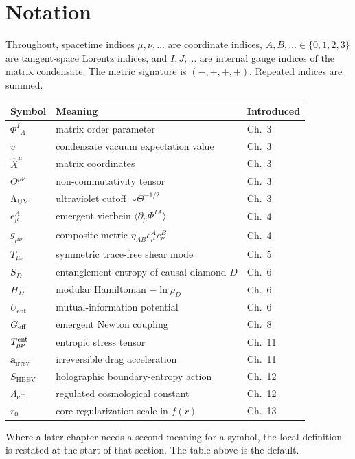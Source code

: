 \chapter{Notation}

Throughout, spacetime indices \(\mu,\nu,\ldots\) are coordinate indices,
\(A,B,\ldots\in\{0,1,2,3\}\) are tangent-space Lorentz indices, and
\(I,J,\ldots\) are internal gauge indices of the matrix condensate.
The metric signature is \((-,+,+,+)\). Repeated indices are summed.

\begin{center}
\begin{tabular}{@{}lll@{}}
\toprule
Symbol & Meaning & Introduced \\
\midrule
\(\Phi^I{}_A\) & matrix order parameter & Ch.~3 \\
\(v\) & condensate vacuum expectation value & Ch.~3 \\
\(\hat X^\mu\) & matrix coordinates & Ch.~3 \\
\(\Theta^{\mu\nu}\) & non-commutativity tensor & Ch.~3 \\
\(\Lambda_{\mathrm{UV}}\) & ultraviolet cutoff \(\sim\Theta^{-1/2}\) & Ch.~3 \\
\(e^A_\mu\) & emergent vierbein \(\langle\partial_\mu\Phi^{IA}\rangle\) & Ch.~4 \\
\(g_{\mu\nu}\) & composite metric \(\eta_{AB}e^A_\mu e^B_\nu\) & Ch.~4 \\
\(T_{\mu\nu}\) & symmetric trace-free shear mode & Ch.~5 \\
\(S_D\) & entanglement entropy of causal diamond \(D\) & Ch.~6 \\
\(H_D\) & modular Hamiltonian \(-\ln\rho_D\) & Ch.~6 \\
\(U_{\mathrm{ent}}\) & mutual-information potential & Ch.~6 \\
\(G_{\mathrm{eff}}\) & emergent Newton coupling & Ch.~8 \\
\(T^{\mathrm{ent}}_{\mu\nu}\) & entropic stress tensor & Ch.~11 \\
\(\mathbf{a}_{\mathrm{irrev}}\) & irreversible drag acceleration & Ch.~11 \\
\(S_{\mathrm{HBEV}}\) & holographic boundary-entropy action & Ch.~12 \\
\(\Lambda_{\mathrm{eff}}\) & regulated cosmological constant & Ch.~12 \\
\(r_0\) & core-regularization scale in \(f(r)\) & Ch.~13 \\
\bottomrule
\end{tabular}
\end{center}

Where a later chapter needs a second meaning for a symbol, the local
definition is restated at the start of that section. The table above is
the default.